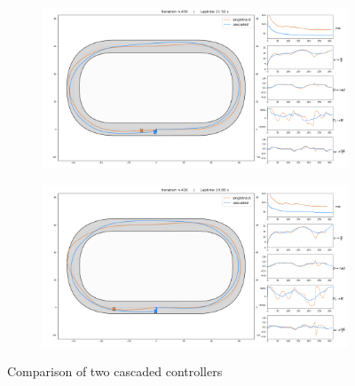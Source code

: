 \documentclass[a4paper, onecolumn, 12pt]{article}
\begin{document}
\begin{figure}[H]
    \centering
    \begin{subfigure}{\textwidth}
        \centering
        \includegraphics[width=\textwidth]{assets/race1_ippodromo.png}
    \end{subfigure}
    \begin{subfigure}{\textwidth}
        \centering
        \includegraphics[width=\textwidth]{assets/race3_ippodromo.png}
        \label{singletrack_outside}
    \end{subfigure}
    \caption[short]{Comparison of two cascaded controllers}
    \label{race_ippodromo}
\end{figure}
\end{document}
